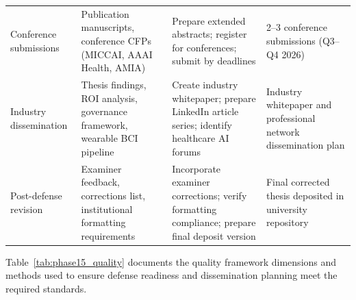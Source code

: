 \begin{xltabular}{\textwidth}{@{} l X X X @{}}
\addlinespace
Conference submissions       & Publication manuscripts, conference CFPs (MICCAI, AAAI Health, AMIA)                              & Prepare extended abstracts; register for conferences; submit by deadlines                                            & 2--3 conference submissions (Q3--Q4 2026) \\
\addlinespace
Industry dissemination       & Thesis findings, ROI analysis, governance framework, wearable BCI pipeline                        & Create industry whitepaper; prepare LinkedIn article series; identify healthcare AI forums                            & Industry whitepaper and professional network dissemination plan \\
\addlinespace
Post-defense revision        & Examiner feedback, corrections list, institutional formatting requirements                         & Incorporate examiner corrections; verify formatting compliance; prepare final deposit version                         & Final corrected thesis deposited in university repository \\
\end{xltabular}
\endgroup

\vspace{1.5em}

Table~\ref{tab:phase15_quality} documents the quality framework dimensions and methods used to ensure defense readiness and dissemination planning meet the required standards.

